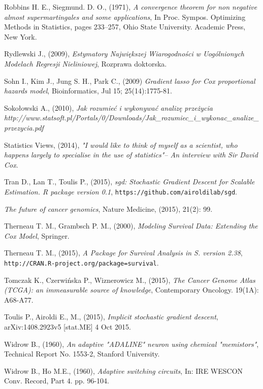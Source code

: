 \begin{thebibliography}{99}
 Robbins H. E., Siegmund. D. O., (1971), \textit{A convergence theorem for non negative almost supermartingales and some applications}, In Proc. Sympos. Optimizing Methods in Statistics, pages 233–257, Ohio State
University. Academic Press, New York.

 Rydlewski J., (2009), \textit{Estymatory Największej Wiarogodności w Uogólnionych Modelach Regresji Nieliniowej}, Rozprawa doktorska.

 Sohn I., Kim J., Jung S. H., Park C., (2009) \textit{Gradient lasso for Cox proportional hazards model}, Bioinformatics, Jul 15; 25(14):1775-81.


 Sokołowski A., (2010), \textit{Jak rozumieć i wykonywać analizę przeżycia} \textit{http://www.statsoft.pl/Portals/0/Downloads/Jak\_rozumiec\_i\_wykonac\_analize\_przezycia.pdf}

 Statistics Views, (2014), \textit{ "I would like to think of myself as a scientist, who happens largely to specialise in the use of statistics"– An interview with Sir David Cox}.

 Tran D., Lan T., Toulis P., (2015), \textit{sgd: Stochastic Gradient Descent for Scalable Estimation. R package version 0.1}, \texttt{https://github.com/airoldilab/sgd}.


 \textit{The future of cancer genomics}, Nature Medicine, (2015), 21(2): 99.

 Therneau T. M., Grambsch P. M., (2000), \textit{Modeling Survival Data: Extending the Cox Model}, Springer.

 Therneau T. M., (2015), \textit{A Package for Survival Analysis in S. version 2.38}, \texttt{http://CRAN.R-project.org/package=survival}.


 Tomczak K., Czerwińska P., Wiznerowicz M., (2015), \textit{The Cancer Genome Atlas (TCGA): an immeasurable source of knowledge}, Contemporary Oncology. 19(1A): A68-A77.


 Toulis P.,Airoldi E., M., (2015), \textit{Implicit stochastic gradient descent}, arXiv:1408.2923v5 [stat.ME] 4 Oct 2015.

 Widrow B., (1960), \textit{An adaptive "ADALINE" neuron using chemical "memistors"}, Technical Report No. 1553-2, Stanford University.

 Widrow B., Ho M.E., (1960), \textit{Adaptive switching circuits}, In: IRE WESCON Conv.
Record, Part 4. pp. 96-104.


\end{thebibliography}
